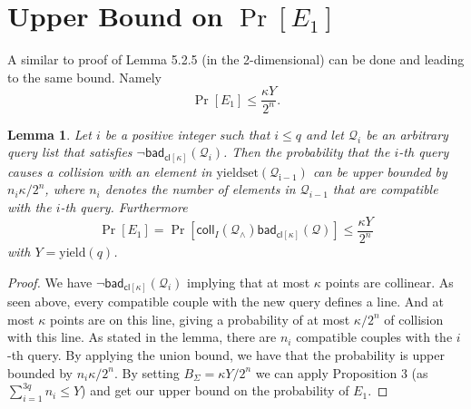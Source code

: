 \documentclass[12pt,a4paper]{article}
\newcommand{\colli}[2]{\mathsf{coll}_{#1}(\mathcal{Q}_{#2})}
\newcommand{\badcl}{\mathsf{bad}_{\mathsf{cl}[\kappa]}(\mathcal{Q})}
\newcommand{\badcli}[1]{\mathsf{bad}_{\mathsf{cl}[\kappa]}(\mathcal{Q}_{#1})}
\newtheorem*{lemma}{Lemma}
\begin{document}
\section*{Upper Bound on $\Pr[E_1]$}
A similar to proof of Lemma 5.2.5 (in the 2-dimensional) can be done and leading to the same bound. Namely
\[
    \Pr[E_1] \leq \frac{\kappa Y}{2^n}.
\]
\begin{lemma}
    Let $i$ be a positive integer such that $i\leq q$ and let $\mathcal{Q}_i$ be an arbitrary query list that satisfies $\lnot\badcli{i}$.
    Then the probability that the $i$-th query causes a collision with an element in $\mathrm{yieldset(\mathcal{Q}_{i-1})}$ can be upper bounded by 
    $n_i\kappa/2^n$, where $n_i$ denotes the number of elements in $\mathcal{Q}_{i-1}$ that are compatible with the $i$-th query. Furthermore
    \[
        \Pr[E_1] = \Pr[\colli{I} \land \badcl] \leq \frac{\kappa Y}{2^n}
    \]
    with $Y=\mathrm{yield}(q)$.
\end{lemma}
\begin{proof}
    We have $\lnot\badcli{i}$ implying that at most $\kappa$ points are collinear. As seen above, every compatible couple with the new query defines a line.
    And at most $\kappa$ points are on this line, giving a probability of at most $\kappa/2^n$ of collision with this line. As stated in the lemma, there are $n_i$ compatible
    couples with the $i$-th query. By applying the union bound, we have that the probability is upper bounded by $n_i\kappa/2^n$.
    By setting $B_{\Sigma} = \kappa Y /2^n$ we can apply Proposition 3 (as $\sum_{i=1}^{3q}n_i \leq Y$)  and get our upper bound on the probability of $E_1$.
\end{proof}
\end{document}
